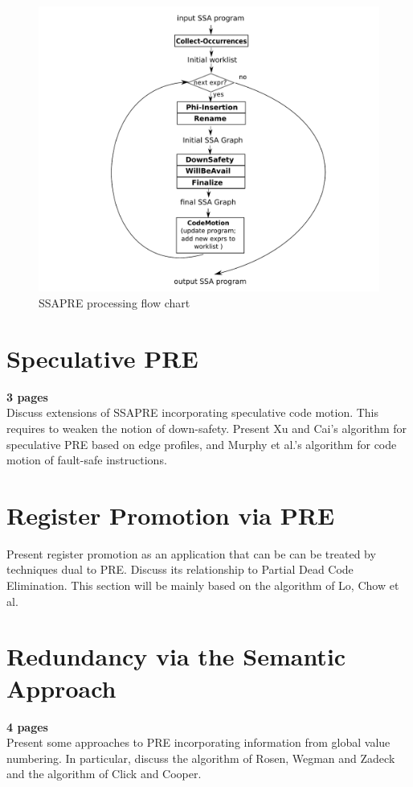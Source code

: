 \begin{figure}
\centering
\includegraphics[scale=0.45]{fig-ssapre-flow.pdf}
\caption{SSAPRE processing flow chart}
\label{fig: ssapre-flow}
\end{figure}
 
\section{Speculative PRE}
{\bf 3 pages} \\
Discuss  extensions of SSAPRE incorporating speculative code 
motion. This requires to weaken the notion of down-safety. 
Present Xu and Cai's algorithm for speculative PRE based on 
edge profiles,  and  Murphy et al.'s algorithm for code motion 
of fault-safe instructions. 

\section{Register Promotion via PRE}
Present register promotion as an application that can be 
can be treated by techniques dual to PRE. Discuss its 
relationship to Partial Dead Code Elimination. This section 
will be mainly based on the algorithm of Lo, Chow et al. 

\section{Redundancy via the Semantic Approach}
\label{section:Part3:Pre_not_helped:SemanticPRE}
{\bf 4 pages} \\
Present some approaches to PRE incorporating information from global 
value numbering. In particular, discuss the  algorithm of Rosen, Wegman and 
 Zadeck and the algorithm of Click and Cooper. 


